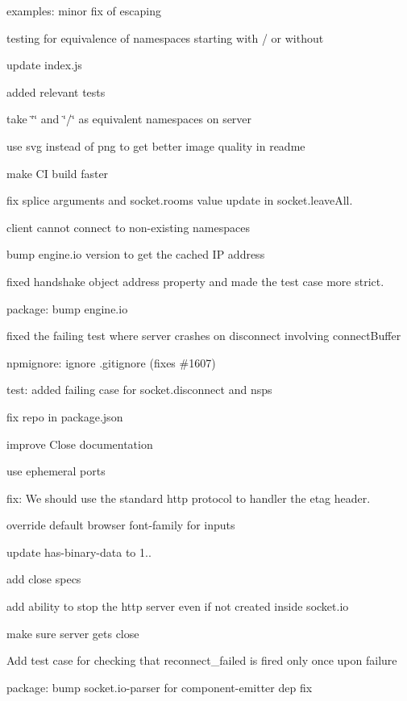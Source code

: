 \begin{DoxyItemize}
\item examples\+: minor fix of escaping
\item testing for equivalence of namespaces starting with / or without
\item update index.\+js
\item added relevant tests
\item take \char`\"{}\char`\"{} and \char`\"{}/\char`\"{} as equivalent namespaces on server
\item use svg instead of png to get better image quality in readme
\item make CI build faster
\item fix splice arguments and {\ttfamily socket.\+rooms} value update in {\ttfamily socket.\+leave\+All}.
\item client cannot connect to non-\/existing namespaces
\item bump engine.\+io version to get the cached IP address
\item fixed handshake object address property and made the test case more strict.
\item package\+: bump {\ttfamily engine.\+io}
\item fixed the failing test where server crashes on disconnect involving connect\+Buffer
\item npmignore\+: ignore {\ttfamily .gitignore} (fixes \#1607)
\item test\+: added failing case for {\ttfamily socket.\+disconnect} and nsps
\item fix repo in package.\+json
\item improve Close documentation
\item use ephemeral ports
\item fix\+: We should use the standard http protocol to handler the etag header.
\item override default browser font-\/family for inputs
\item update has-\/binary-\/data to 1..
\item add close specs
\item add ability to stop the http server even if not created inside socket.\+io
\item make sure server gets close
\item Add test case for checking that reconnect\+\_\+failed is fired only once upon failure
\item package\+: bump {\ttfamily socket.\+io-\/parser} for {\ttfamily component-\/emitter} dep fix
\end{DoxyItemize}

